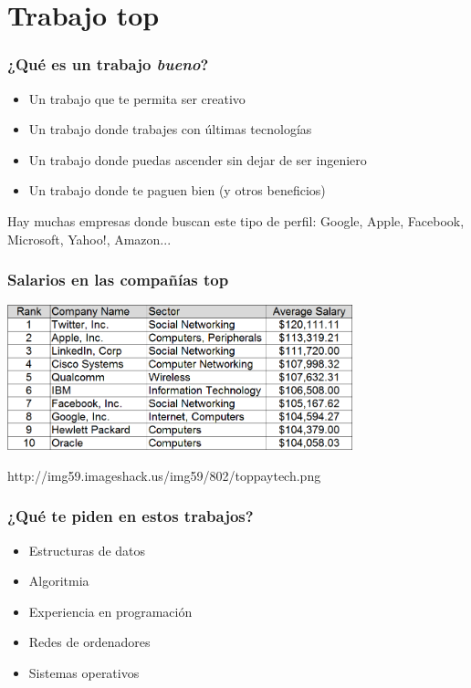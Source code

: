 \section{Trabajo top}


\begin{frame}
\frametitle{¿Qué es un trabajo \emph{bueno}?}

\begin{itemize}
   \item Un trabajo que te permita ser creativo
   \item Un trabajo donde trabajes con últimas tecnologías
   \item Un trabajo donde puedas ascender sin dejar de ser ingeniero
   \item Un trabajo donde te paguen bien (y otros beneficios)
\end{itemize}

Hay muchas empresas donde buscan este tipo de perfil: Google, Apple, Facebook,
Microsoft, Yahoo!, Amazon...

\end{frame}


\begin{frame}
\frametitle{Salarios en las compañías top}

\begin{center}
  \includegraphics[width=10cm]{figs/toppaytech.png}
\end{center}


\begin{flushright}
{\tiny
http://img59.imageshack.us/img59/802/toppaytech.png
}
\end{flushright}

\end{frame}



\begin{frame}
\frametitle{¿Qué te piden en estos trabajos?}

\begin{itemize}
   \item Estructuras de datos
   \item Algoritmia
   \item Experiencia en programación
   \item Redes de ordenadores
   \item Sistemas operativos
\end{itemize}

\end{frame}


